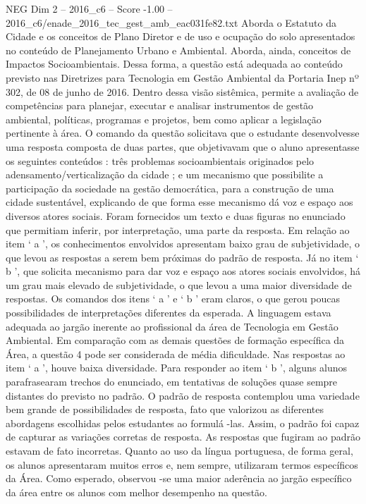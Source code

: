 \begin{textsample}{NEG Dim 2 – 2016\_c6 – Score -1.00 – 2016\_c6/enade\_2016\_tec\_gest\_amb\_eac031fe82.txt}
Aborda o Estatuto da Cidade e os conceitos de Plano Diretor e de uso e ocupação do solo apresentados no conteúdo de Planejamento Urbano e Ambiental.
Aborda, ainda, conceitos de Impactos Socioambientais.
Dessa forma, a questão está adequada ao conteúdo previsto nas Diretrizes para Tecnologia em Gestão Ambiental da Portaria Inep nº 302, de 08 de junho de 2016.
Dentro dessa visão sistêmica, permite a avaliação de competências para planejar, executar e analisar instrumentos de gestão ambiental, políticas, programas e projetos, bem como aplicar a legislação pertinente à área.
O comando da questão solicitava que o estudante desenvolvesse uma resposta composta de duas partes, que objetivavam que o aluno apresentasse os seguintes conteúdos : três problemas socioambientais originados pelo adensamento/verticalização da cidade ; e um mecanismo que possibilite a participação da sociedade na gestão democrática, para a construção de uma cidade sustentável, explicando de que forma esse mecanismo dá voz e espaço aos diversos atores sociais.
Foram fornecidos um texto e duas figuras no enunciado que permitiam inferir, por interpretação, uma parte da resposta.
Em relação ao item ‘ a ’, os conhecimentos envolvidos apresentam baixo grau de subjetividade, o que levou as respostas a serem bem próximas do padrão de resposta.
Já no item ‘ b ’, que solicita mecanismo para dar voz e espaço aos atores sociais envolvidos, há um grau mais elevado de subjetividade, o que levou a uma maior diversidade de respostas.
Os comandos dos itens ‘ a ’ e ‘ b ’ eram claros, o que gerou poucas possibilidades de interpretações diferentes da esperada.
A linguagem estava adequada ao jargão inerente ao profissional da área de Tecnologia em Gestão Ambiental.
Em comparação com as demais questões de formação específica da Área, a questão 4 pode ser considerada de média dificuldade.
Nas respostas ao item ‘ a ’, houve baixa diversidade.
Para responder ao item ‘ b ’, alguns alunos parafrasearam trechos do enunciado, em tentativas de soluções quase sempre distantes do previsto no padrão.
O padrão de resposta contemplou uma variedade bem grande de possibilidades de resposta, fato que valorizou as diferentes abordagens escolhidas pelos estudantes ao formulá -las.
Assim, o padrão foi capaz de capturar as variações corretas de resposta.
As respostas que fugiram ao padrão estavam de fato incorretas.
Quanto ao uso da língua portuguesa, de forma geral, os alunos apresentaram muitos erros e, nem sempre, utilizaram termos específicos da Área.
Como esperado, observou -se uma maior aderência ao jargão específico da área entre os alunos com melhor desempenho na questão.

\end{textsample}

